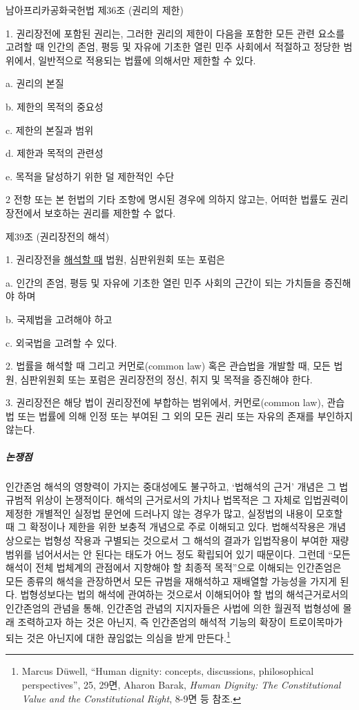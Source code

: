 \begin{displayquote}
남아프리카공화국헌법 제36조 (권리의 제한)

1. 권리장전에 포함된 권리는, 그러한 권리의 제한이 다음을 포함한 모든 관련 요소를 고려할 때 인간의 존엄, 평등 및 자유에 기초한 열린 민주 사회에서 적절하고 정당한 범위에서, 일반적으로 적용되는 법률에 의해서만 제한할 수 있다.

a. 권리의 본질

b. 제한의 목적의 중요성

c. 제한의 본질과 범위

d. 제한과 목적의 관련성

e. 목적을 달성하기 위한 덜 제한적인 수단

2 전항 또는 본 헌법의 기타 조항에 명시된 경우에 의하지 않고는, 어떠한 법률도 권리장전에서 보호하는 권리를 제한할 수 없다.

제39조 (권리장전의 해석)

1. 권리장전을 \ul{해석할 때} 법원, 심판위원회 또는 포럼은

a. 인간의 존엄, 평등 및 자유에 기초한 열린 민주 사회의 근간이 되는 가치들을 증진해야 하며

b. 국제법을 고려해야 하고

c. 외국법을 고려할 수 있다.

2. 법률을 해석할 때 그리고 커먼로(common law) 혹은 관습법을 개발할 때, 모든 법원, 심판위원회 또는 포럼은 권리장전의 정신, 취지 및 목적을 증진해야 한다.

3. 권리장전은 해당 법이 권리장전에 부합하는 범위에서, 커먼로(common law), 관습법 또는 법률에 의해 인정 또는 부여된 그 외의 모든 권리 또는 자유의 존재를 부인하지 않는다.
\end{displayquote}

\subparagraph{논쟁점}

인간존엄 해석의 영향력이 가지는 중대성에도 불구하고, `법해석의 근거' 개념은 그 법규범적 위상이 논쟁적이다. 해석의 근거로서의 가치나 법목적은 그 자체로 입법권력이 제정한 개별적인 실정법 문언에 드러나지 않는 경우가 많고, 실정법의 내용이 모호할 때 그 확정이나 제한을 위한 보충적 개념으로 주로 이해되고 있다. 법해석작용은 개념상으로는 법형성 작용과 구별되는 것으로서 그 해석의 결과가 입법작용이 부여한 재량범위를 넘어서서는 안 된다는 태도가 어느 정도 확립되어 있기 때문이다. 그런데 ``모든 해석이 전체 법체계의 관점에서 지향해야 할 최종적 목적''으로 이해되는 인간존엄은 모든 종류의 해석을 관장하면서 모든 규범을 재해석하고 재배열할 가능성을 가지게 된다. 법형성보다는 법의 해석에 관여하는 것으로서 이해되어야 할 법의 해석근거로서의 인간존엄의 관념을 통해, 인간존엄 관념의 지지자들은 사법에 의한 월권적 법형성에 몰래 조력하고자 하는 것은 아닌지, 즉 인간존엄의 해석적 기능의 확장이 트로이목마가 되는 것은 아닌지에 대한 끊임없는 의심을 받게 만든다.\footnote{Marcus Düwell, ``Human dignity: concepts, discussions, philosophical perspectives'', 25, 29면, Aharon Barak, \emph{Human Dignity: The Constitutional Value and the Constitutional Right}, 8-9면 등 참조.}

